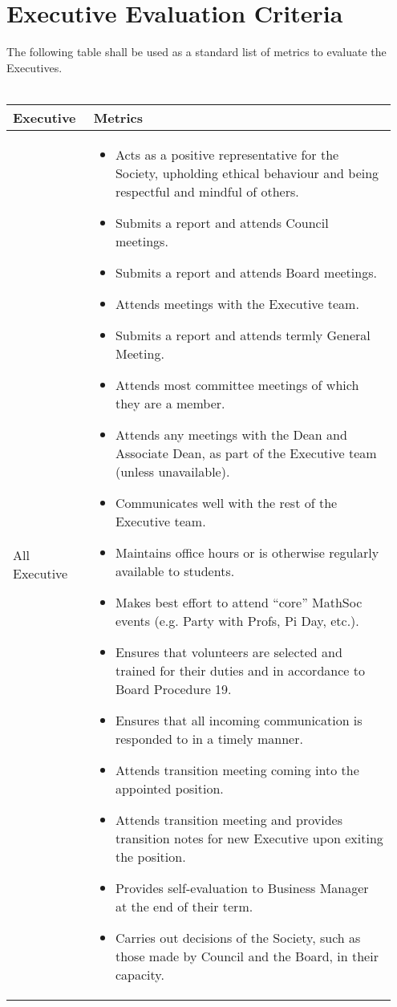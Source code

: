 \section{Executive Evaluation Criteria}

The following table shall be used as a standard list of metrics to evaluate the Executives.\\
\\
\begin{longtable}{p{0.2\linewidth} p{0.75\linewidth}}
\toprule
Executive & Metrics\\
\midrule
All Executive &
\begin{itemize}
\item Acts as a positive representative for the Society, upholding ethical behaviour and being respectful and mindful of others.
\item Submits a report and attends Council meetings.
\item Submits a report and attends Board meetings.
\item Attends meetings with the Executive team.
\item Submits a report and attends termly General Meeting.
\item Attends most committee meetings of which they are a member.
\item Attends any meetings with the Dean and Associate Dean, as part of the Executive team (unless unavailable).
\item Communicates well with the rest of the Executive team.
\item Maintains office hours or is otherwise regularly available to students.
\item Makes best effort to attend “core” MathSoc events (e.g. Party with Profs, Pi Day, etc.).
\item Ensures that volunteers are selected and trained for their duties and in accordance to Board Procedure 19.
\item Ensures that all incoming communication is responded to in a timely manner.
\item Attends transition meeting coming into the appointed position.
\item Attends transition meeting and provides transition notes for new Executive upon exiting the position.
\item Provides self-evaluation to Business Manager at the end of their term.
\item Carries out decisions of the Society, such as those made by Council and the Board, in their capacity.

\end{itemize}
\end{longtable}
